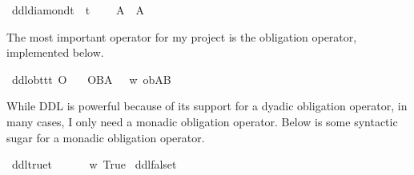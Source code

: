 \begin{isabellebody}
{}\isanewline
{}\isamarkupfalse%
\ ddldiamond{\isacharcolon}{\isacharcolon}{\isachardoublequoteopen}t\ {\isasymRightarrow}\ t{\isachardoublequoteclose}\ {\isacharparenleft}{\isachardoublequoteopen}{\isasymdiamond}{\isachardoublequoteclose}{\isacharparenright}\isanewline
\ \ \ {\isachardoublequoteopen}{\isasymdiamond}A\ {\isasymequiv}\ \isactrlbold {\isasymnot}{\isacharparenleft}{\isasymbox}{\isacharparenleft}\isactrlbold {\isasymnot}A{\isacharparenright}{\isacharparenright}{\isachardoublequoteclose}\isanewline
%
%
\begin{isamarkuptext}%
\noindent The most important operator for my project is the obligation operator, implemented below.%
\end{isamarkuptext}\isamarkuptrue%
\isamarkupfalse%
\ ddlob{\isacharcolon}{\isacharcolon}{\isachardoublequoteopen}t{\isasymRightarrow}t{\isasymRightarrow}t{\isachardoublequoteclose}\ {\isacharparenleft}{\isachardoublequoteopen}O{\isacharbraceleft}{\isacharunderscore}{\isacharbar}{\isacharunderscore}{\isacharbraceright}{\isachardoublequoteclose}{\isacharparenright}\isanewline
\ \ \ {\isachardoublequoteopen}O{\isacharbraceleft}B{\isacharbar}A{\isacharbraceright}\ {\isasymequiv}\ {\isasymlambda}\ w{\isachardot}\ ob{\isacharparenleft}A{\isacharparenright}{\isacharparenleft}B{\isacharparenright}{\isachardoublequoteclose}\isanewline
%
%
\begin{isamarkuptext}%
While DDL is powerful because of its support for a dyadic obligation operator, in many cases, 
I only need a monadic obligation operator. Below is some syntactic sugar for a monadic obligation operator.%
\end{isamarkuptext}\isamarkuptrue%
\isamarkupfalse%
\ ddltrue{\isacharcolon}{\isacharcolon}{\isachardoublequoteopen}t{\isachardoublequoteclose}\ {\isacharparenleft}{\isachardoublequoteopen}\isactrlbold {\isasymtop}{\isachardoublequoteclose}{\isacharparenright}\isanewline
\ \ \ {\isachardoublequoteopen}\isactrlbold {\isasymtop}\ {\isasymequiv}\ {\isasymlambda}w{\isachardot}\ True{\isachardoublequoteclose}\isanewline
{}\isamarkupfalse%
\ ddlfalse{\isacharcolon}{\isacharcolon}{\isachardoublequoteopen}t{\isachardoublequoteclose}\ {\isacharparenleft}{\isachardoublequoteopen}\isactrlbold {\isasymbottom}{\isachardoublequoteclose}{\isacharparenright}\isanewline

\end{isabellebody}
